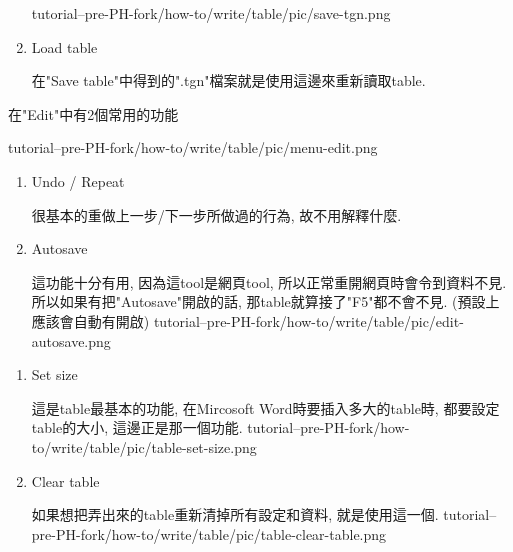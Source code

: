 \begin{enumerate}
{    \InsertFigure
      {tutorial--pre-PH-fork/how-to/write/table/pic/save-tgn.png}

  } %

  \item
  {
    Load table

    在"Save table"中得到的".tgn"檔案就是使用這邊來重新讀取table.
  } %
  \end{enumerate}

\newpage
{}

  在"Edit"中有2個常用的功能

  \InsertFigure
    {tutorial--pre-PH-fork/how-to/write/table/pic/menu-edit.png}

  \begin{enumerate}

  \item
  {
    Undo / Repeat

    很基本的重做上一步/下一步所做過的行為, 故不用解釋什麼.
  } %

  \item
  {
    Autosave

    這功能十分有用, 因為這tool是網頁tool, 所以正常重開網頁時會令到資料不見. 所以如果有把"Autosave"開啟的話, 那table就算接了"F5"都不會不見. (預設上應該會自動有開啟)
    \InsertFigure
      {tutorial--pre-PH-fork/how-to/write/table/pic/edit-autosave.png}
  } %

  \end{enumerate}

\newpage
{}

  \begin{enumerate}

  \item
  {
    Set size

    這是table最基本的功能, 在Mircosoft Word時要插入多大的table時, 都要設定table的大小, 這邊正是那一個功能.
    \InsertFigure
      {tutorial--pre-PH-fork/how-to/write/table/pic/table-set-size.png}
  } %

  \item
  {
    Clear table

    如果想把弄出來的table重新清掉所有設定和資料, 就是使用這一個.
    \InsertFigure
      {tutorial--pre-PH-fork/how-to/write/table/pic/table-clear-table.png}
  } %

  \end{enumerate}

